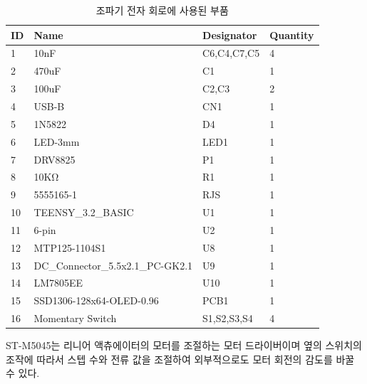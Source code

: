 \begin{table}[H]
    \centering
    \caption{조파기 전자 회로에 사용된 부품}
    \label{Specification of Teensy Board}
\begin{tabular}{l|llll}
\hline
ID & Name                             & \multicolumn{2}{l}{Designator}  & Quantity \\ \hline
1  & 10nF                             & \multicolumn{2}{l}{C6,C4,C7,C5} & 4        \\
2  & 470uF                            & \multicolumn{2}{l}{C1}          & 1        \\
3  & 100uF                            & \multicolumn{2}{l}{C2,C3}       & 2        \\
4  & USB-B                            & \multicolumn{2}{l}{CN1}         & 1        \\
5  & 1N5822                           & \multicolumn{2}{l}{D4}          & 1        \\
6  & LED-3mm                          & \multicolumn{2}{l}{LED1}        & 1        \\
7  & DRV8825                          & \multicolumn{2}{l}{P1}          & 1        \\
8  & 10KΩ                             & \multicolumn{2}{l}{R1}          & 1        \\
9  & 5555165-1                        & \multicolumn{2}{l}{RJS}         & 1        \\
10 & TEENSY\_3.2\_BASIC               & \multicolumn{2}{l}{U1}          & 1        \\
11 & 6-pin                            & \multicolumn{2}{l}{U2}          & 1        \\
12 & MTP125-1104S1                    & \multicolumn{2}{l}{U8}          & 1        \\
13 & DC\_Connector\_5.5x2.1\_PC-GK2.1 & \multicolumn{2}{l}{U9}          & 1        \\
14 & LM7805EE                         & \multicolumn{2}{l}{U10}         & 1        \\
15 & SSD1306-128x64-OLED-0.96         & \multicolumn{2}{l}{PCB1}        & 1        \\
16 & Momentary Switch                 & \multicolumn{2}{l}{S1,S2,S3,S4} & 4       
\\ \hline
\end{tabular}
\end{table}

ST-M5045는 리니어 액츄에이터의 모터를 조절하는 모터 드라이버이며 옆의 스위치의 조작에 따라서 스텝 수와 전류 값을 조절하여 외부적으로도 모터 회전의 감도를 바꿀 수 있다.

